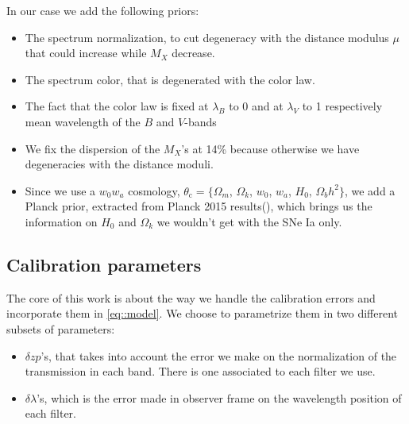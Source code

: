 \documentclass[\docopts]{\docclass}
\begin{document}
In our case we add the following priors:
\begin{itemize}
\item The spectrum normalization, to cut degeneracy with the distance modulus $\mu$ that could increase while $M_X$ decrease.
\item The spectrum color, that is degenerated with the color law.
\item The fact that the color law is fixed at $\lambda_B$ to 0 and at $\lambda_V$ to 1 respectively mean wavelength of the $B$ and $V$-bands
\item We fix the dispersion of the $M_X$'s at 14\% because otherwise we have degeneracies with the distance moduli.
\item Since we use a $w_0w_a$ cosmology, $\theta_\text{c} = \{ \Omega_m$, $\Omega_k$, $w_0$, $w_a$, $H_0$, $\Omega_bh^2 \}$, we add a Planck prior, extracted from Planck 2015 results(\cite{1502.01589}), which brings us the information on $H_0$ and $\Omega_k$ we wouldn't get with the SNe Ia only.
\end{itemize}


\subsection{Calibration parameters}
\label{subsec::calib_uncertainties}
The core of this work is about the way we handle the calibration errors and incorporate them in \ref{eq::model}.
We choose to parametrize them in two different subsets of parameters:
\begin{itemize}
\item $\delta zp$'s, that takes into account the error we make on the normalization of the transmission in each band.
There is one associated to each filter we use.
\item $\delta \lambda$'s, which is the error made in observer frame on the wavelength position of each filter. 
\end{itemize}
\end{document}
